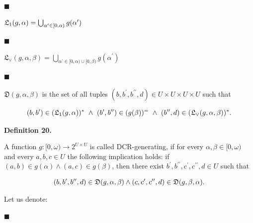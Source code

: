 \documentclass[10pt,a4paper]{amsart}
\begin{document}
\par\noindent  $\blacksquare$ 
 
$\mathfrak{L}_{1}(g,\alpha)=\bigcup_{\alpha^{\prime}\in[0,\alpha)}g(\alpha^{%
\prime})$\par
 
 
 
\par\noindent  $\blacksquare$ 
 
$\mathfrak{L}_{\vee}(g,\alpha,\beta)=\bigcup_{\alpha^{\prime}\in[0,\alpha)\cup[%
0,\beta)}g(\alpha^{\prime})$\par
 
 
 
\par\noindent  $\blacksquare$ 
 
$\mathfrak{D}(g,\alpha,\beta)$ is the set of all tuples $(b,b^{\prime},b^{\prime\prime},d)\in U\times U\times U\times U$ such that\par
    \[(b,b^{\prime})\in(\mathfrak{L}_{1}(g,\alpha))^{*}\leavevmode\nobreak\ \wedge%
\leavevmode\nobreak\ (b^{\prime},b^{\prime\prime})\in(g(\beta))^{=}\leavevmode%
\nobreak\ \wedge\leavevmode\nobreak\ (b^{\prime\prime},d)\in(\mathfrak{L}_{%
\vee}(g,\alpha,\beta))^{*}.\]    
 
  
 
 
\par\medskip\noindent\textbf{Definition 20.}\par
 
 
A function $g:[0,\omega)\to 2^{U\times U}$ is called DCR-generating, if for every $\alpha,\beta\in[0,\omega)$ and every $a,b,c\in U$ the following implication holds: if $(a,b)\in g(\alpha)\wedge(a,c)\in g(\beta)$, then there exist $b^{\prime},b^{\prime\prime},c^{\prime},c^{\prime\prime},d\in U$ such that\par
    \[(b,b^{\prime},b^{\prime\prime},d)\in\mathfrak{D}(g,\alpha,\beta)\wedge(c,c^{%
\prime},c^{\prime\prime},d)\in\mathfrak{D}(g,\beta,\alpha).\]    
 
 
 
Let us denote:\par
  
\par\noindent  $\blacksquare$ 
 
\end{document}
